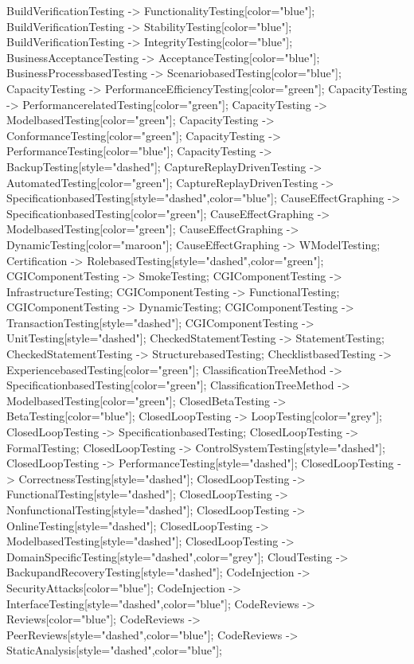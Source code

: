 \documentclass{article}
\begin{document}
{BuildVerificationTesting -> FunctionalityTesting[color="blue"];
BuildVerificationTesting -> StabilityTesting[color="blue"];
BuildVerificationTesting -> IntegrityTesting[color="blue"];
BusinessAcceptanceTesting -> AcceptanceTesting[color="blue"];
BusinessProcessbasedTesting -> ScenariobasedTesting[color="blue"];
CapacityTesting -> PerformanceEfficiencyTesting[color="green"];
CapacityTesting -> PerformancerelatedTesting[color="green"];
CapacityTesting -> ModelbasedTesting[color="green"];
CapacityTesting -> ConformanceTesting[color="green"];
CapacityTesting -> PerformanceTesting[color="blue"];
CapacityTesting -> BackupTesting[style="dashed"];
CaptureReplayDrivenTesting -> AutomatedTesting[color="green"];
CaptureReplayDrivenTesting -> SpecificationbasedTesting[style="dashed",color="blue"];
CauseEffectGraphing -> SpecificationbasedTesting[color="green"];
CauseEffectGraphing -> ModelbasedTesting[color="green"];
CauseEffectGraphing -> DynamicTesting[color="maroon"];
CauseEffectGraphing -> WModelTesting;
Certification -> RolebasedTesting[style="dashed",color="green"];
CGIComponentTesting -> SmokeTesting;
CGIComponentTesting -> InfrastructureTesting;
CGIComponentTesting -> FunctionalTesting;
CGIComponentTesting -> DynamicTesting;
CGIComponentTesting -> TransactionTesting[style="dashed"];
CGIComponentTesting -> UnitTesting[style="dashed"];
CheckedStatementTesting -> StatementTesting;
CheckedStatementTesting -> StructurebasedTesting;
ChecklistbasedTesting -> ExperiencebasedTesting[color="green"];
ClassificationTreeMethod -> SpecificationbasedTesting[color="green"];
ClassificationTreeMethod -> ModelbasedTesting[color="green"];
ClosedBetaTesting -> BetaTesting[color="blue"];
ClosedLoopTesting -> LoopTesting[color="grey"];
ClosedLoopTesting -> SpecificationbasedTesting;
ClosedLoopTesting -> FormalTesting;
ClosedLoopTesting -> ControlSystemTesting[style="dashed"];
ClosedLoopTesting -> PerformanceTesting[style="dashed"];
ClosedLoopTesting -> CorrectnessTesting[style="dashed"];
ClosedLoopTesting -> FunctionalTesting[style="dashed"];
ClosedLoopTesting -> NonfunctionalTesting[style="dashed"];
ClosedLoopTesting -> OnlineTesting[style="dashed"];
ClosedLoopTesting -> ModelbasedTesting[style="dashed"];
ClosedLoopTesting -> DomainSpecificTesting[style="dashed",color="grey"];
CloudTesting -> BackupandRecoveryTesting[style="dashed"];
CodeInjection -> SecurityAttacks[color="blue"];
CodeInjection -> InterfaceTesting[style="dashed",color="blue"];
CodeReviews -> Reviews[color="blue"];
CodeReviews -> PeerReviews[style="dashed",color="blue"];
CodeReviews -> StaticAnalysis[style="dashed",color="blue"];
}
\end{document}
